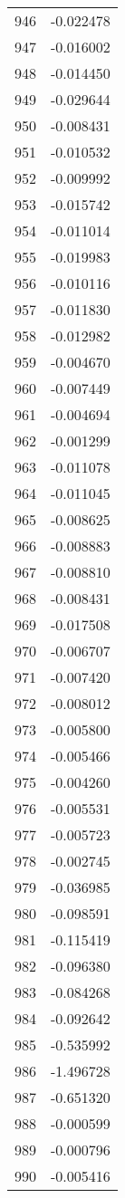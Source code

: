 \documentclass[12pt]{article}
\begin{document}
\begin{longtable}{@{}cc@{}}
946 & -0.022478 \\
947 & -0.016002 \\
948 & -0.014450 \\
949 & -0.029644 \\
950 & -0.008431 \\
951 & -0.010532 \\
952 & -0.009992 \\
953 & -0.015742 \\
954 & -0.011014 \\
955 & -0.019983 \\
956 & -0.010116 \\
957 & -0.011830 \\
958 & -0.012982 \\
959 & -0.004670 \\
960 & -0.007449 \\
961 & -0.004694 \\
962 & -0.001299 \\
963 & -0.011078 \\
964 & -0.011045 \\
965 & -0.008625 \\
966 & -0.008883 \\
967 & -0.008810 \\
968 & -0.008431 \\
969 & -0.017508 \\
970 & -0.006707 \\
971 & -0.007420 \\
972 & -0.008012 \\
973 & -0.005800 \\
974 & -0.005466 \\
975 & -0.004260 \\
976 & -0.005531 \\
977 & -0.005723 \\
978 & -0.002745 \\
979 & -0.036985 \\
980 & -0.098591 \\
981 & -0.115419 \\
982 & -0.096380 \\
983 & -0.084268 \\
984 & -0.092642 \\
985 & -0.535992 \\
986 & -1.496728 \\
987 & -0.651320 \\
988 & -0.000599 \\
989 & -0.000796 \\
990 & -0.005416 \\

\end{longtable}
\end{document}
